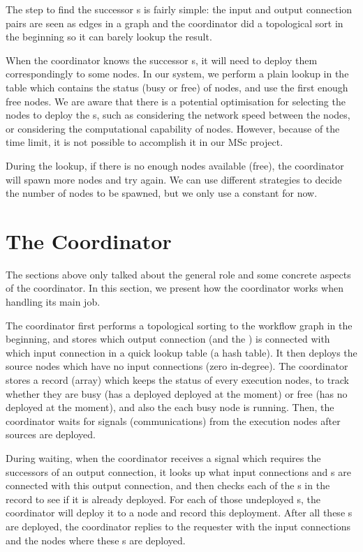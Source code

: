 The step to find the successor \tPEInst{}s is fairly simple: the input and output connection pairs are seen as edges in a graph and the coordinator did a topological sort in the beginning so it can barely lookup the result.

When the coordinator knows the successor \tPEInst{}s, it will need to deploy them correspondingly to some nodes. In our system, we perform a plain lookup in the table which contains the status (busy or free) of nodes, and use the first enough free nodes. We are aware that there is a potential optimisation for selecting the nodes to deploy the \tPEInst{}s, such as considering the network speed between the nodes, or considering the computational capability of nodes. However, because of the time limit, it is not possible to accomplish it in our MSc project.

During the lookup, if there is no enough nodes available (free), the coordinator will spawn more nodes and try again. We can use different strategies to decide the number of nodes to be spawned, but we only use a constant for now.

\section{The Coordinator} \label{sec:incdep_coord}
The sections above only talked about the general role and some concrete aspects of the coordinator. In this section, we present how the coordinator works when handling its main job.

The coordinator first performs a topological sorting to the workflow graph in the beginning, and stores which output connection (and the \tPEInst) is connected with which input connection in a quick lookup table (\eg a hash table). It then deploys the source nodes which have no input connections (\ie zero in-degree). The coordinator stores a record (array) which keeps the status of every execution nodes, to track whether they are busy (has a \tPEInst deployed deployed at the moment) or free (has no \tPEInst deployed at the moment), and also the \tPEInst each busy node is running.
Then, the coordinator waits for signals (\ie communications) from the execution nodes after sources are deployed.

During waiting, when the coordinator receives a signal which requires the successors of an output connection, it looks up what input connections and \tPEInst{}s are connected with this output connection, and then checks each of the \tPEInst{}s in the record to see if it is already deployed. For each of those undeployed \tPEInst{}s, the coordinator will deploy it to a node and record this deployment. After all these \tPEInst{}s are deployed, the coordinator replies to the requester with the input connections and the nodes where these \tPEInst{}s are deployed.


